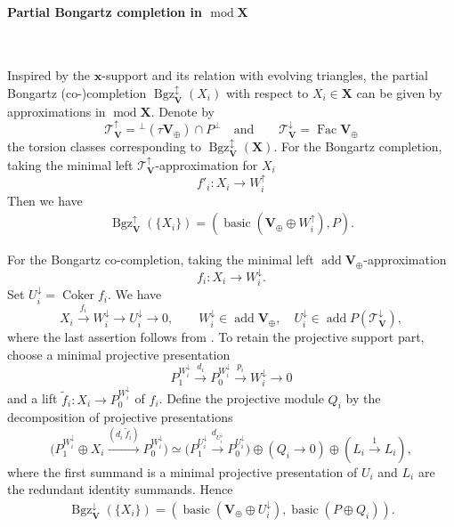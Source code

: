 \documentclass[11pt,reqno]{amsart}
\theoremstyle{plain}
\theoremstyle{definition}
\numberwithin{equation}{section}
\newcommand\hua{\mathcal}
\newcommand\<{\langle}
\renewcommand\>{\rangle}
\newcommand\Add{\operatorname{add}}
\newcommand{\on}[1]{\operatorname{#1}}
\newcommand{\pcts}[1]{\mathbf{#1}}%
\newcommand{\pcto}[1]{\mathbf{#1}_\oplus} %
\def\xx{\mathbf{x}}%
\newcommand{\Bgzp}[2]{\operatorname{Bgz}^{\uparrow}_{#2}(#1)}
\newcommand{\Bgzm}[2]{\operatorname{Bgz}^{\downarrow}_{#2}(#1)}
\newcommand{\Bgzpm}[2]{\operatorname{Bgz}^{\updownarrow}_{#2}(#1)}
\begin{document}
\paragraph{\textbf{Partial Bongartz completion in $\on{mod}\pcts{X}$}}\

Inspired by the $\xx$-support and its relation with evolving triangles, 
the partial Bongartz (co-)completion $\Bgzpm{X_i}{\pcts{V}}$ with respect to $X_i\in\pcts{X}$ can be given by approximations in $\on{mod}\pcts{X}$.
Denote by 
\[
\hua{T}^\uparrow_\pcts{V}={}^\perp(\tau \pcto{V})\cap P^\perp
\quad\text{and}\qquad
\hua{T}^\downarrow_\pcts{V}=\on{Fac}\pcto{V}
\]
the torsion classes corresponding to $\Bgzpm{\pcts{X}}{\pcts{V}}$.
For the Bongartz completion, 
taking the minimal left $\hua{T}^\uparrow_{\pcts{V}}$-approximation for $X_i$
\[
    f'_i\colon X_i\longrightarrow W^\uparrow_i
\]
Then we have
\begin{gather}
    \Bgzp{\{X_i\}}{\pcts{V}}=(\on{basic}(\pcto{V}\oplus W^\uparrow_i), P).    
\end{gather}

For the Bongartz co-completion,
taking the minimal left $\Add\pcto{V}$-approximation
\[
 f_i\colon X_i\longrightarrow W^\downarrow_i.
\]
Set $U^\downarrow_i=\on{Coker} f_i$. We have
\[
    X_i\xrightarrow{f_i}W^\downarrow_i\longrightarrow U^\downarrow_i\longrightarrow0,
    \qquad
    W^\downarrow_i\in\Add\pcto{V},\quad
    U^\downarrow_i\in\Add P(\mathcal{T}_{\pcts{V}}^{\downarrow}),
\]
where the last assertion follows from \cite[Lem.~2.20]{AIR}.
To retain the projective support part, choose a minimal projective presentation
\[
    P_1^{W^\downarrow_i}\xrightarrow{d_i}P_0^{W^\downarrow_i}
        \xrightarrow{p_i}W^\downarrow_i\longrightarrow0
\]
and a lift $\widetilde f_i\colon X_i\to P_0^{W^\downarrow_i}$ of $f_i$.
Define the projective module $Q_i$ by the decomposition of projective
presentations
\[
 \bigl(P_1^{W^\downarrow_i}\oplus X_i
       \xrightarrow{(d_i\ \widetilde f_i)}P_0^{W^\downarrow_i}\bigr)
 \simeq
 \bigl(P_1^{U^\downarrow_i}\xrightarrow{d_{U^\downarrow_i}}P_0^{U^\downarrow_i}\bigr)
 \oplus(Q_i\longrightarrow0)
 \oplus(L_i\xrightarrow{1}L_i),
\]
where the first summand is a minimal projective presentation of $U_i$ and $L_i$ are the redundant identity summands.
Hence
\begin{gather}
    \Bgzm{\{X_i\}}{\pcts{V}}=(\on{basic}(\pcto{V}\oplus U^\downarrow_i),\on{basic}(P\oplus Q_i)).
\end{gather}
\end{document}
